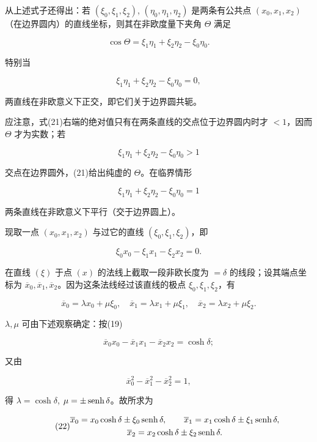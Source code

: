 从上述式子还得出：若 $(\xi_0,\xi_1,\xi_2)$, $(\eta_0,\eta_1,\eta_2)$ 是两条有公共点 $(x_0,x_1,x_2)$（在边界圆内）的直线坐标，则其在非欧度量下夹角 $\Theta$ 满足

\[
\tag{21}
 \cos\Theta=\xi_1\eta_1+\xi_2\eta_2-\xi_0\eta_0.
\]

特别当

\[
 \xi_1\eta_1+\xi_2\eta_2-\xi_0\eta_0=0,
\]

两直线在非欧意义下正交，即它们关于边界圆共轭。



应注意，式(21)右端的绝对值只有在两条直线的交点位于边界圆内时才 \(<1\)，因而 \(\Theta\) 才为实数；若

\[
 \xi_1\eta_1+\xi_2\eta_2-\xi_0\eta_0>1
\]

交点在边界圆外，(21)给出纯虚的 $\Theta$。在临界情形

\[
 \xi_1\eta_1+\xi_2\eta_2-\xi_0\eta_0=1
\]

两条直线在非欧意义下平行（交于边界圆上）。



现取一点 $(x_0,x_1,x_2)$ 与过它的直线 $(\xi_0,\xi_1,\xi_2)$，即

\[
 \xi_0x_0-\xi_1x_1-\xi_2x_2=0.
\]

在直线 \((\xi)\) 于点 \((x)\) 的法线上截取一段非欧长度为 $=\delta$ 的线段；设其端点坐标为 $\overline x_0,\overline x_1,\overline x_2$。因为这条法线经过该直线的极点 $\xi_0,\xi_1,\xi_2$，有

\[
 \overline x_0=\lambda x_0+\mu\xi_0,
 \quad
 \overline x_1=\lambda x_1+\mu\xi_1,
 \quad
 \overline x_2=\lambda x_2+\mu\xi_2.
\]

\(\lambda,\mu\) 可由下述观察确定：按(19)

\[
 \overline x_0x_0-\overline x_1x_1-\overline x_2x_2=\cosh\delta;
\]

又由

\[
 \overline x_0^2-\overline x_1^2-\overline x_2^2=1,
\]

得 $\lambda=\cosh\delta$, $\mu=\pm\operatorname{senh}\delta$。故所求为

\[
\tag{22}
\begin{gathered}
 \overline x_0=x_0\cosh\delta\pm\xi_0\operatorname{senh}\delta,\qquad
 \overline x_1=x_1\cosh\delta\pm\xi_1\operatorname{senh}\delta,\\
 \overline x_2=x_2\cosh\delta\pm\xi_2\operatorname{senh}\delta.
\end{gathered}
\]


